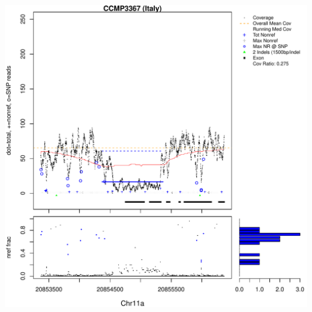 \documentclass{article}\usepackage[]{graphicx}\usepackage[]{color}
\makeatletter
\def\maxwidth{ %
  \ifdim\Gin@nat@width>\linewidth
    \linewidth
  \else
    \Gin@nat@width
  \fi
}
\newenvironment{knitrout}{}{} %
\makeatother
\begin{document}
\begin{knitrout}
{\includegraphics[width=\maxwidth]{figs-knitr/unnamed-chunk-51-7} 

}



\end{knitrout}
\end{document}
